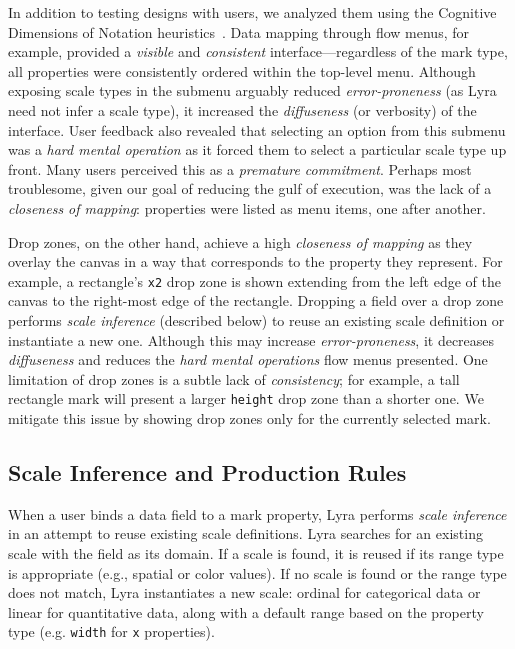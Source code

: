 In addition to testing designs with users, we analyzed them using the Cognitive
Dimensions of Notation heuristics~\cite{blackwell:cogdim}. Data mapping through
flow menus, for example, provided a \emph{visible} and \emph{consistent}
interface---regardless of the mark type, all properties were consistently
ordered within the top-level menu. Although exposing scale types in the submenu
arguably reduced \emph{error\--proneness} (as Lyra need not infer a scale type),
it increased the \emph{diffuseness} (or verbosity) of the interface. User
feedback also revealed that selecting an option from this submenu was a
\emph{hard mental operation} as it forced them to select a particular scale type
up front. Many users perceived this as a \emph{premature commitment}. Perhaps
most troublesome, given our goal of reducing the gulf of execution, was the lack
of a \emph{closeness of mapping}: properties were listed as menu items, one
after another.

Drop zones, on the other hand, achieve a high \emph{closeness of mapping} as
they overlay the canvas in a way that corresponds to the property they
represent. For example, a rectangle's \texttt{x2} drop zone is shown extending
from the left edge of the canvas to the right-most edge of the rectangle.
Dropping a field over a drop zone performs \emph{scale inference} (described
below) to reuse an existing scale definition or instantiate a new one. Although
this may increase \emph{error-proneness}, it decreases \emph{diffuseness} and
reduces the \emph{hard mental operations} flow menus presented. One limitation
of drop zones is a subtle lack of \emph{consistency}; for example, a tall
rectangle mark will present a larger \texttt{height} drop zone than a shorter
one. We mitigate this issue by showing drop zones only for the currently
selected mark.

\subsection{Scale Inference and Production Rules}

When a user binds a data field to a mark property, Lyra performs \emph{scale
inference} in an attempt to reuse existing scale definitions. Lyra searches for
an existing scale with the field as its domain. If a scale is found, it is
reused if its range type is appropriate (e.g., spatial or color values). If no
scale is found or the range type does not match, Lyra instantiates a new scale:
ordinal for categorical data or linear for quantitative data, along with a
default range based on the property type (e.g. \texttt{width} for \texttt{x}
properties).

